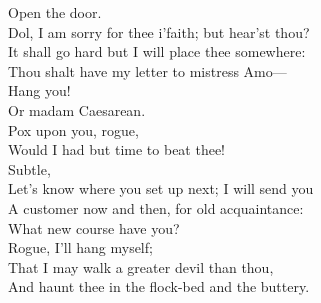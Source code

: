 \documentclass[a4paper,oneside,12pt]{memoir}
\begin{document}
\begin{drama*}
\mammonspeaks {} Open the door.\\
\facespeaks Dol, I am sorry for thee i'faith; but hear'st thou?\\
It shall go hard but I will place thee somewhere:\\
Thou shalt have my letter to mistress Amo---\\
\dolspeaks Hang you!\\
\facespeaks {} Or madam Caesarean.\\
\dolspeaks {} Pox upon you, rogue,\\
Would I had but time to beat thee!\\
\facespeaks {} Subtle,\\
Let's know where you set up next; I will send you\\
A customer now and then, for old acquaintance:\\
What new course have you?\\
\subtlespeaks {} Rogue, I'll hang myself;\\
That I may walk a greater devil than thou,\\
And haunt thee in the flock-bed and the buttery.\\
\scene


\end{drama*}
\end{document}
